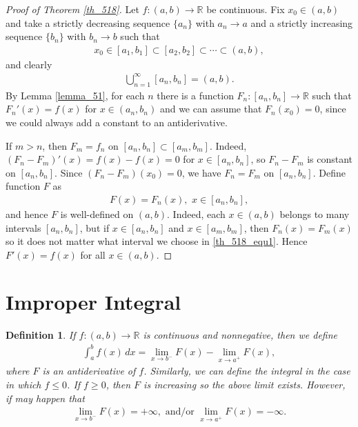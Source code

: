 \documentclass[11pt]{book}
\newtheorem{definition}{Definition}[chapter]
\theoremstyle{definition}
\numberwithin{equation}{chapter}
\begin{document}
\begin{proof}[Proof of Theorem \ref{th_518}]
Let $f: (a,b) \to \mathbb{R}$ be continuous. Fix $x_0 \in (a,b)$ and take a strictly decreasing sequence $\{a_n\}$ with $a_n \to a$ and a strictly increasing sequence $\{b_n\}$ with $b_n \to b$ such that 
\begin{align*}
    x_0 \in [a_1,b_1] \subset [a_2,b_2] \subset \cdots \subset (a,b),
\end{align*}
and clearly 
\begin{align*}
    \bigcup^\infty_{n=1} [a_n,b_n] = (a,b).
\end{align*}
By Lemma \ref{lemma_51}, for each $n$ there is a function $F_n: [a_n,b_n] \to \mathbb{R}$ such that $F_n'(x) = f(x)$ for $x \in (a_n,b_n)$ and we can assume that $F_n(x_0) = 0$, since we could always add a constant to an antiderivative.

If $m > n$, then $F_m = f_n$ on $[a_n,b_n] \subset [a_m,b_m]$. Indeed, $(F_n - F_m)'(x) = f(x) - f(x) = 0$ for $x \in [a_n,b_n]$, so $F_n - F_m$ is constant on $[a_n,b_n]$. Since $(F_n - F_m)(x_0) = 0$, we have $F_n = F_m$ on $[a_n,b_n]$. Define function $F$ as
\begin{align}\label{th_518_equ1}
    F(x) = F_n(x), \,\, x \in [a_n,b_n],
\end{align}
and hence $F$ is well-defined on $(a,b)$. Indeed, each $x \in (a,b)$ belongs to many intervals $[a_n,b_n]$, but if $x \in [a_n,b_n]$ and $x \in [a_m,b_m]$, then $F_n(x) = F_m(x)$ so it does not matter what interval we choose in \eqref{th_518_equ1}. Hence $F'(x) = f(x)$ for all $x \in (a,b)$.
\end{proof}


\medskip



\section{Improper Integral}

\begin{definition}
If $f: (a,b) \to \mathbb{R}$ is continuous and nonnegative, then we define
\begin{align*}
    \int^b_a f(x) \,dx = \lim_{x \to b^-} F(x) - \lim_{x \to a^+} F(x),
\end{align*}
where $F$ is an antiderivative of $f$. Similarly, we can define the integral in the case in which $f \leq 0$. If $f \geq 0$, then $F$ is increasing so the above limit exists. However, if may happen that 
\begin{align*}
    \lim_{x \to b^-} F(x) = + \infty, \,\, \text{and/or} \,\, \lim_{x \to a^+} F(x) = -\infty.
\end{align*}
\end{definition}
\end{document}
